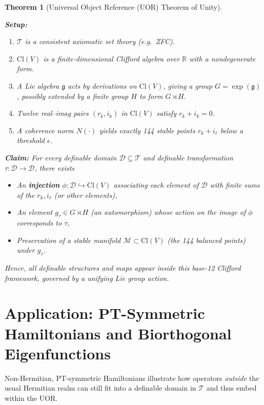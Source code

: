 \documentclass[11pt]{article}
\newtheorem{theorem}{Theorem}[section]
\begin{document}
\begin{theorem}[Universal Object Reference (UOR) Theorem of Unity]
\label{thm:UOR-Unity}
\quad

\noindent
\textbf{Setup:}
\begin{enumerate}
\item $\mathcal{T}$ is a consistent axiomatic set theory (e.g.\ ZFC).
\item $\mathrm{Cl}(V)$ is a finite-dimensional Clifford algebra over $\mathbb{R}$ with a nondegenerate form.
\item A Lie algebra $\mathfrak{g}$ acts by derivations on $\mathrm{Cl}(V)$, giving a group $G=\exp(\mathfrak{g})$, possibly extended by a finite group $H$ to form $G\rtimes H$.
\item Twelve real--imag pairs $(r_k,i_k)$ in $\mathrm{Cl}(V)$ satisfy $r_k + i_k=0$.
\item A coherence norm $N(\cdot)$ yields exactly 144 stable points $r_k + i_\ell$ below a threshold $\epsilon$.
\end{enumerate}

\noindent
\textbf{Claim:}  
For every \emph{definable domain} $\mathcal{D}\subseteq \mathcal{T}$ and \emph{definable transformation} $\tau:\mathcal{D}\to\mathcal{D}$, there exists
\begin{itemize}
    \item An \textbf{injection} $\phi:\mathcal{D}\hookrightarrow \mathrm{Cl}(V)$ associating each element of $\mathcal{D}$ with finite sums of the $r_k,i_\ell$ (or other elements), 
    \item An element $g_\tau\in G\rtimes H$ (an automorphism) whose action on the image of $\phi$ corresponds to $\tau$,
    \item Preservation of a stable manifold $\mathcal{M} \subset \mathrm{Cl}(V)$ (the 144 balanced points) under $g_\tau$.
\end{itemize}
Hence, \emph{all definable structures and maps} appear inside this base-12 Clifford framework, governed by a unifying Lie group action.

\end{theorem}

\section{Application: PT-\-Symmetric Hamiltonians and Biorthogonal Eigenfunctions}

Non-Hermitian, PT-symmetric Hamiltonians illustrate how operators \emph{outside} the usual Hermitian realm can still fit into a definable domain in $\mathcal{T}$ and thus embed within the UOR. 
\end{document}
